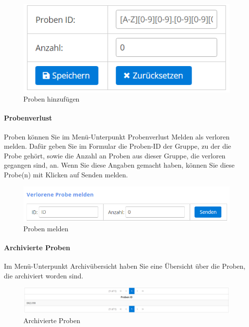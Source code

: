 \documentclass[enabledeprecatedfontcommands,fontsize=12pt,paper=a4,twoside]{scrartcl}
\begin{document}
\begin{figure}[h!]
\begin{center}
 \includegraphics[width=\textwidth]{screenshots/l/probeadd.png}
  \caption{Proben hinzufügen}
  \label{fig:boat1}
\end{center}
\end{figure}

\paragraph{Probenverlust}
Proben können Sie im Menü-Unterpunkt Probenverlust Melden als verloren melden. Dafür geben Sie im Formular die Proben-ID der Gruppe, zu der die Probe gehört, sowie die Anzahl an Proben aus dieser Gruppe, die verloren gegangen sind, an. Wenn Sie diese Angaben gemacht haben, können Sie diese Probe(n) mit Klicken auf Senden melden. \\

\begin{figure}[h!]
\begin{center}
 \includegraphics[width=\textwidth]{screenshots/l/probemelden.png}
  \caption{Proben melden}
  \label{fig:boat1}
\end{center}
\end{figure}

\paragraph{Archivierte Proben}
Im Menü-Unterpunkt Archivübersicht haben Sie eine Übersicht über die Proben, die archiviert worden sind. \\

\begin{figure}[h!]
\begin{center}
 \includegraphics[width=\textwidth]{screenshots/l/probenarchiv.png}
  \caption{Archivierte Proben}
  \label{fig:boat1}
\end{center}
\end{figure}
\end{document}
